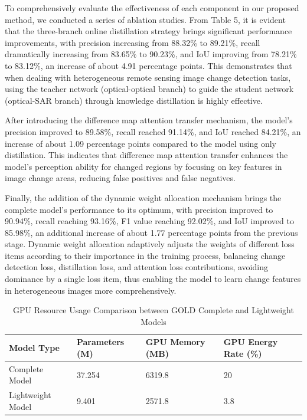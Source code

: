 \documentclass[a4paper,fleqn]{cas-dc}
\begin{document}
To comprehensively evaluate the effectiveness of each component in our proposed method, we conducted a series of ablation studies. From Table 5, it is evident that the three-branch online distillation strategy brings significant performance improvements, with precision increasing from 88.32\% to 89.21\%, recall dramatically increasing from 83.65\% to 90.23\%, and IoU improving from 78.21\% to 83.12\%, an increase of about 4.91 percentage points. This demonstrates that when dealing with heterogeneous remote sensing image change detection tasks, using the teacher network (optical-optical branch) to guide the student network (optical-SAR branch) through knowledge distillation is highly effective.

After introducing the difference map attention transfer mechanism, the model's precision improved to 89.58\%, recall reached 91.14\%, and IoU reached 84.21\%, an increase of about 1.09 percentage points compared to the model using only distillation. This indicates that difference map attention transfer enhances the model's perception ability for changed regions by focusing on key features in image change areas, reducing false positives and false negatives.

Finally, the addition of the dynamic weight allocation mechanism brings the complete model's performance to its optimum, with precision improved to 90.94\%, recall reaching 93.16\%, F1 value reaching 92.02\%, and IoU improved to 85.98\%, an additional increase of about 1.77 percentage points from the previous stage. Dynamic weight allocation adaptively adjusts the weights of different loss items according to their importance in the training process, balancing change detection loss, distillation loss, and attention loss contributions, avoiding dominance by a single loss item, thus enabling the model to learn change features in heterogeneous images more comprehensively.

\begin{table}[htbp]
\centering
\caption{GPU Resource Usage Comparison between GOLD Complete and Lightweight Models}
\begin{tabular}{llll}
\hline
Model Type & Parameters (M) & GPU Memory (MB) & GPU Energy Rate (\%) \\
\hline
Complete Model & 37.254 & 6319.8 & 20 \\
Lightweight Model & 9.401 & 2571.8 & 3.8 \\
\hline
\end{tabular}
\label{tab:resource_usage}
\end{table}
\end{document}
